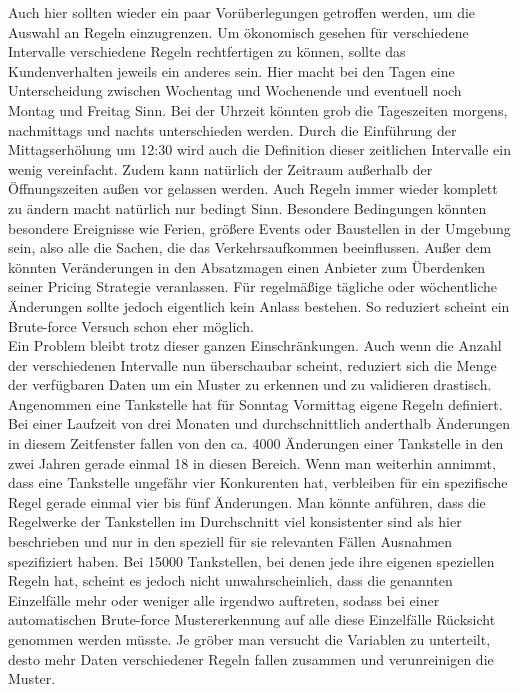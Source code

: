 \documentclass[12pt,a4paper,bibliography=totocnumbered,listof=totocnumbered]{scrartcl}
\begin{document}
Auch hier sollten wieder ein paar Vorüberlegungen getroffen werden, um die Auswahl an Regeln einzugrenzen. Um ökonomisch gesehen für verschiedene Intervalle verschiedene Regeln rechtfertigen zu können, sollte das Kundenverhalten jeweils ein anderes sein. Hier macht bei den Tagen eine Unterscheidung zwischen Wochentag und Wochenende und eventuell noch Montag und Freitag Sinn. Bei der Uhrzeit könnten grob die Tageszeiten morgens, nachmittags und nachts unterschieden werden. Durch die Einführung der Mittagserhöhung um 12:30 wird auch die Definition dieser zeitlichen Intervalle ein wenig vereinfacht. Zudem kann natürlich der Zeitraum außerhalb der Öffnungszeiten außen vor gelassen werden. Auch Regeln immer wieder komplett zu ändern macht natürlich nur bedingt Sinn. Besondere Bedingungen könnten besondere Ereignisse wie Ferien, größere Events oder Baustellen in der Umgebung sein, also alle die Sachen, die das Verkehrsaufkommen beeinflussen. Außer dem könnten Veränderungen in den Absatzmagen einen Anbieter zum Überdenken seiner Pricing Strategie veranlassen. Für regelmäßige tägliche oder wöchentliche Änderungen sollte jedoch eigentlich kein Anlass bestehen. So reduziert scheint ein Brute-force Versuch schon eher möglich.\\

Ein Problem bleibt trotz dieser ganzen Einschränkungen. Auch wenn die Anzahl der verschiedenen Intervalle nun überschaubar scheint, reduziert sich die Menge der verfügbaren Daten um ein Muster zu erkennen und zu validieren drastisch. Angenommen eine Tankstelle hat für Sonntag Vormittag eigene Regeln definiert. Bei einer Laufzeit von drei Monaten und durchschnittlich anderthalb Änderungen in diesem Zeitfenster fallen von den ca. 4000 Änderungen einer Tankstelle in den zwei Jahren gerade einmal 18 in diesen Bereich. Wenn man weiterhin annimmt, dass eine Tankstelle ungefähr vier Konkurenten hat, verbleiben für ein spezifische Regel gerade einmal vier bis fünf Änderungen. Man könnte anführen, dass die Regelwerke der Tankstellen im Durchschnitt viel konsistenter sind als hier beschrieben und nur in den speziell für sie relevanten Fällen Ausnahmen spezifiziert haben. Bei 15000 Tankstellen, bei denen jede ihre eigenen speziellen Regeln hat, scheint es jedoch nicht unwahrscheinlich, dass die genannten Einzelfälle mehr oder weniger alle irgendwo auftreten, sodass bei einer automatischen Brute-force Mustererkennung auf alle diese Einzelfälle Rücksicht genommen werden müsste. Je gröber man versucht die Variablen zu unterteilt, desto mehr Daten verschiedener Regeln fallen zusammen und verunreinigen die Muster.\\
\end{document}

